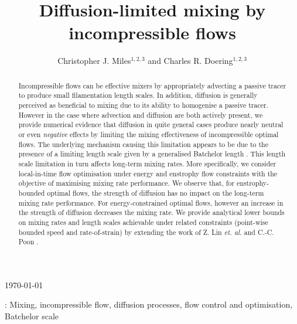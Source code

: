 \documentclass[12pt]{iopart}
\begin{document}
\title[Diffusion-limited mixing by incompressible flows]{Diffusion-limited mixing by incompressible flows}

\author{Christopher J. Miles$^{1,2,3}$ and Charles R. Doering$^{1,2,3}$ }

\address{$^1$ Department of Physics, University of Michigan,
Ann Arbor, MI 48104-1040, USA}
\address{$^2$ Department of Mathematics, University of Michigan,
Ann Arbor, MI 48104-1043, USA}
\address{$^3$ Center for the Study of Complex Systems, University of Michigan,
Ann Arbor, MI 48104-1107, USA}
\vspace{10pt}
\begin{indented}
\item[]\today
\end{indented}

\begin{abstract}
Incompressible flows can be effective mixers by appropriately advecting a passive tracer to produce small filamentation length scales. In addition, diffusion is generally perceived as beneficial to mixing due to its ability to homogenise a passive tracer. However in the case where advection and diffusion are both actively present, we provide numerical evidence that diffusion in quite general cases produce nearly neutral or even {\it negative} effects by limiting the mixing effectiveness of incompressible optimal flows. The underlying mechanism causing this limitation appears to be due to the presence of a limiting length scale given by a generalised Batchelor length \cite{Batchelor1959a}. This length scale limitation in turn affects long-term mixing rates. More specifically, we consider local-in-time flow optimisation under energy and enstrophy flow constraints with the objective of maximising mixing rate performance. We observe that, for enstrophy-bounded optimal flows, the strength of diffusion has no impact on the long-term mixing rate performance. For energy-constrained optimal flows, however an increase in the strength of diffusion decreases the mixing rate. We provide analytical lower bounds on mixing rates and length scales achievable under related constraints (point-wise bounded speed and rate-of-strain) by extending the work of Z. Lin {\it et. al.} \cite{JFM2011} and C.-C. Poon \cite{Chi-Cheu1996}. 

\end{abstract}
%
%
\vspace{2pc}
: Mixing, incompressible flow, diffusion processes, flow control and optimisation, Batchelor scale
\end{document}
